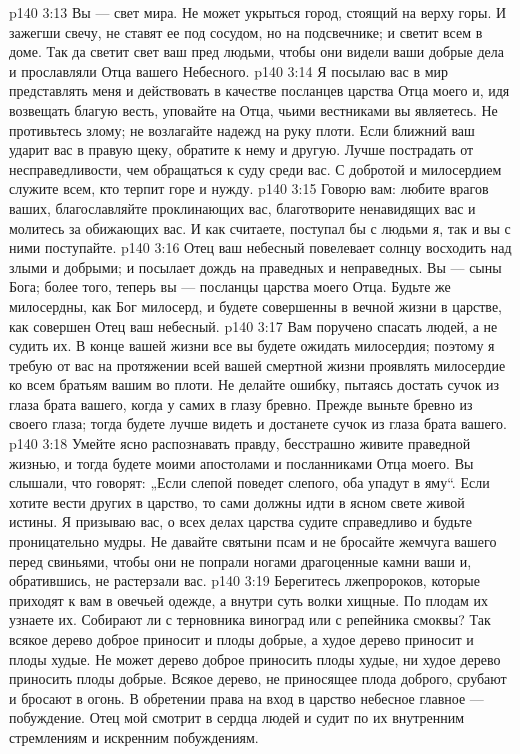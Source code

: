 \vs p140 3:13 Вы --- свет мира. Не может укрыться город, стоящий на верху горы. И зажегши свечу, не ставят ее под сосудом, но на подсвечнике; и светит всем в доме. Так да светит свет ваш пред людьми, чтобы они видели ваши добрые дела и прославляли Отца вашего Небесного.
\vs p140 3:14 Я посылаю вас в мир представлять меня и действовать в качестве посланцев царства Отца моего и, идя возвещать благую весть, уповайте на Отца, чьими вестниками вы являетесь. Не противьтесь злому; не возлагайте надежд на руку плоти. Если ближний ваш ударит вас в правую щеку, обратите к нему и другую. Лучше пострадать от несправедливости, чем обращаться к суду среди вас. С добротой и милосердием служите всем, кто терпит горе и нужду.
\vs p140 3:15 Говорю вам: любите врагов ваших, благославляйте проклинающих вас, благотворите ненавидящих вас и молитесь за обижающих вас. И как считаете, поступал бы с людьми я, так и вы с ними поступайте.
\vs p140 3:16 Отец ваш небесный повелевает солнцу восходить над злыми и добрыми; и посылает дождь на праведных и неправедных. Вы --- сыны Бога; более того, теперь вы --- посланцы царства моего Отца. Будьте же милосердны, как Бог милосерд, и будете совершенны в вечной жизни в царстве, как совершен Отец ваш небесный.
\vs p140 3:17 Вам поручено спасать людей, а не судить их. В конце вашей жизни все вы будете ожидать милосердия; поэтому я требую от вас на протяжении всей вашей смертной жизни проявлять милосердие ко всем братьям вашим во плоти. Не делайте ошибку, пытаясь достать сучок из глаза брата вашего, когда у самих в глазу бревно. Прежде выньте бревно из своего глаза; тогда будете лучше видеть и достанете сучок из глаза брата вашего.
\vs p140 3:18 Умейте ясно распознавать правду, бесстрашно живите праведной жизнью, и тогда будете моими апостолами и посланниками Отца моего. Вы слышали, что говорят: „Если слепой поведет слепого, оба упадут в яму“. Если хотите вести других в царство, то сами должны идти в ясном свете живой истины. Я призываю вас, о всех делах царства судите справедливо и будьте проницательно мудры. Не давайте святыни псам и не бросайте жемчуга вашего перед свиньями, чтобы они не попрали ногами драгоценные камни ваши и, обратившись, не растерзали вас.
\vs p140 3:19 Берегитесь лжепророков, которые приходят к вам в овечьей одежде, а внутри суть волки хищные. По плодам их узнаете их. Собирают ли с терновника виноград или с репейника смоквы? Так всякое дерево доброе приносит и плоды добрые, а худое дерево приносит и плоды худые. Не может дерево доброе приносить плоды худые, ни худое дерево приносить плоды добрые. Всякое дерево, не приносящее плода доброго, срубают и бросают в огонь. В обретении права на вход в царство небесное главное --- побуждение. Отец мой смотрит в сердца людей и судит по их внутренним стремлениям и искренним побуждениям.
